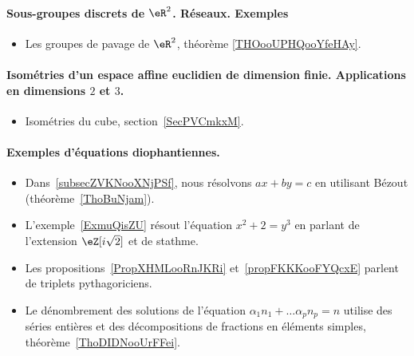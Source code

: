 \paragraph{Sous-groupes discrets de \( \eR^2\). Réseaux. Exemples}
\begin{itemize}
    \item Les groupes de pavage de \( \eR^2\), théorème \ref{THOooUPHQooYfeHAy}.
\end{itemize}
\paragraph{Isométries d'un espace affine euclidien de dimension finie. Applications en dimensions $2$ et $3$.}
\begin{itemize}
    \item Isométries du cube, section~\ref{SecPVCmkxM}.
\end{itemize}
\paragraph{Exemples d’équations diophantiennes.}
\begin{itemize}
    \item Dans~\ref{subsecZVKNooXNjPSf}, nous résolvons \( ax+by=c\) en utilisant Bézout (théorème~\ref{ThoBuNjam}).
    \item L'exemple~\ref{ExmuQisZU} résout l'équation \( x^2+2=y^3\) en parlant de l'extension \( \eZ[i\sqrt{2}]\) et de stathme.
    \item Les propositions~\ref{PropXHMLooRnJKRi} et~\ref{propFKKKooFYQcxE} parlent de triplets pythagoriciens.
    \item Le dénombrement des solutions de l'équation \( \alpha_1 n_1+\ldots \alpha_pn_p=n\) utilise des séries entières et des décompositions de fractions en éléments simples, théorème~\ref{ThoDIDNooUrFFei}.
\end{itemize}
